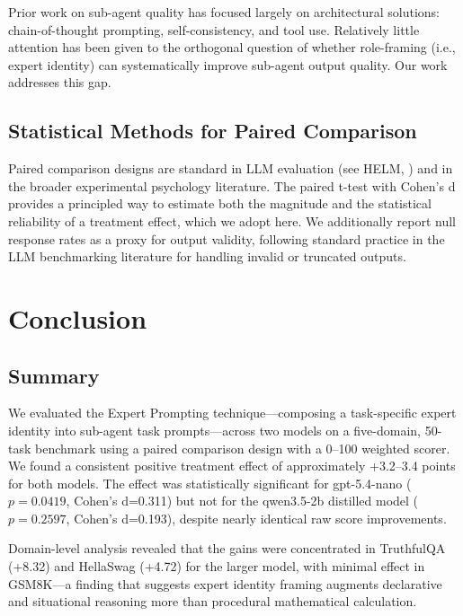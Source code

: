 \documentclass[anonymous, submission, paper]{iclr2026}
\begin{document}
Prior work on sub-agent quality has focused largely on architectural solutions: chain-of-thought prompting, self-consistency, and tool use. Relatively little attention has been given to the orthogonal question of whether role-framing (i.e., expert identity) can systematically improve sub-agent output quality. Our work addresses this gap.

\subsection{Statistical Methods for Paired Comparison}
\label{sec:statistical_methods_related}

Paired comparison designs are standard in LLM evaluation (see HELM, \citep{liang2022helm}) and in the broader experimental psychology literature. The paired t-test with Cohen's d provides a principled way to estimate both the magnitude and the statistical reliability of a treatment effect, which we adopt here. We additionally report null response rates as a proxy for output validity, following standard practice in the LLM benchmarking literature for handling invalid or truncated outputs.

\section{Conclusion}
\label{sec:conclusion}

\subsection{Summary}
\label{sec:summary}

We evaluated the Expert Prompting technique---composing a task-specific expert identity into sub-agent task prompts---across two models on a five-domain, 50-task benchmark using a paired comparison design with a 0--100 weighted scorer. We found a consistent positive treatment effect of approximately +3.2--3.4 points for both models. The effect was statistically significant for gpt-5.4-nano ($p=0.0419$, Cohen's d=0.311) but not for the qwen3.5-2b distilled model ($p=0.2597$, Cohen's d=0.193), despite nearly identical raw score improvements.

Domain-level analysis revealed that the gains were concentrated in TruthfulQA (+8.32) and HellaSwag (+4.72) for the larger model, with minimal effect in GSM8K---a finding that suggests expert identity framing augments declarative and situational reasoning more than procedural mathematical calculation.
\end{document}
